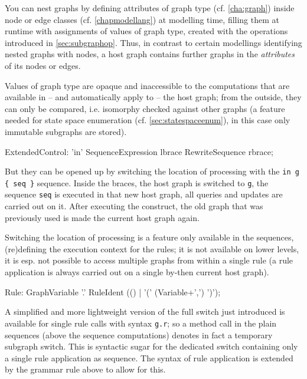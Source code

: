 You can nest graphs by defining attributes of graph type (cf. \ref{cha:graph}) inside node or edge classes (cf. \ref{chapmodellang}) at modelling time, 
filling them at runtime with assignments of values of graph type, created with the operations introduced in \ref{sec:subgraphop}.
Thus, in contrast to certain modellings identifying nested graphs with nodes, a host graph contains further graphs in the \emph{attributes} of its nodes or edges.

Values of graph type are opaque and inaccessible to the computations that are available in -- and automatically apply to -- the host graph; 
from the outside, they can only be compared, i.e. isomorphy checked against other graphs
(a feature needed for state space enumeration (cf. \ref{sec:statespaceenum}), in this case only immutable subgraphs are stored).

\begin{rail} 
  ExtendedControl: 
    'in' SequenceExpression lbrace RewriteSequence rbrace;
\end{rail}

But they can be opened up by switching the location of processing with the \verb#in g { seq }# sequence.
Inside the braces, the host graph is switched to \texttt{g}, the sequence \texttt{seq} is executed in that new host graph, all queries and updates are carried out on it. 
After executing the construct, the old graph that was previously used is made the current host graph again.

Switching the location of processing is a feature only available in the sequences, (re)defining the execution context for the rules; it is not available on lower levels, it is esp. not possible to access multiple graphs from within a single rule (a rule application is always carried out on a single by-then current host graph).

\begin{rail}
  Rule: GraphVariable '.' RuleIdent (() | '(' (Variable+',') ')');
\end{rail}

A simplified and more lightweight version of the full switch just introduced is available for single rule calls with syntax \verb#g.r#; so a method call in the plain sequences (above the sequence computations) denotes in fact a temporary subgraph switch.
This is syntactic sugar for the dedicated switch containing only a single rule application as sequence.
The syntax of rule application is extended by the grammar rule above to allow for this.

